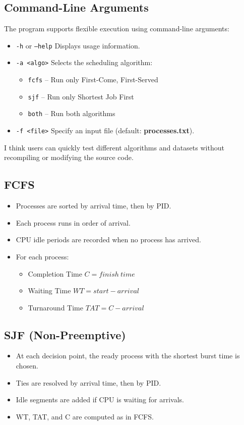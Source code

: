 \documentclass[12pt,a4paper]{article}
\begin{document}
\subsection{Command-Line Arguments}
The program supports flexible execution using command-line arguments:
\begin{itemize}
    \item \texttt{-h} or \texttt{--help} \quad Displays usage information.
    \item \texttt{-a <algo>} \quad Selects the scheduling algorithm:
        \begin{itemize}
            \item \texttt{fcfs} -- Run only First-Come, First-Served
            \item \texttt{sjf} -- Run only Shortest Job First
            \item \texttt{both} -- Run both algorithms
        \end{itemize}
    \item \texttt{-f <file>} \quad Specify an input file (default: \textbf{processes.txt}).
\end{itemize}

I think users can quickly test different algorithms and datasets without recompiling or modifying the source code.

\subsection{FCFS}
\begin{itemize}
    \item Processes are sorted by arrival time, then by PID.  
    \item Each process runs in order of arrival.  
    \item CPU idle periods are recorded when no process has arrived.  
    \item For each process:  
        \begin{itemize}
            \item Completion Time $C = finish~time$
            \item Waiting Time $WT = start - arrival$
            \item Turnaround Time $TAT = C - arrival$
        \end{itemize}
\end{itemize}

\subsection{SJF (Non-Preemptive)}
\begin{itemize}
    \item At each decision point, the ready process with the shortest burst time is chosen.  
    \item Ties are resolved by arrival time, then by PID.  
    \item Idle segments are added if CPU is waiting for arrivals.  
    \item WT, TAT, and C are computed as in FCFS.  
\end{itemize}
\end{document}

